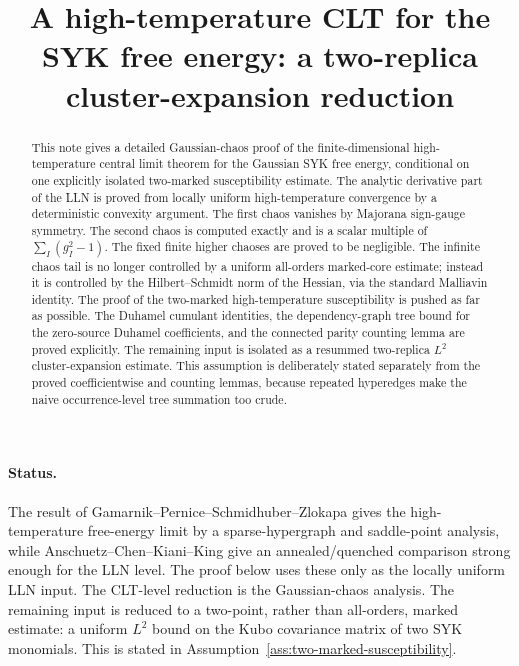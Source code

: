 \documentclass[11pt]{article}
\title{A high-temperature CLT for the SYK free energy: a two-replica cluster-expansion reduction}
\author{}
\date{}
\begin{document}
\maketitle

\begin{abstract}
  This note gives a detailed Gaussian-chaos proof of the finite-dimensional
  high-temperature central limit theorem for the Gaussian SYK free energy,
  conditional on one explicitly isolated two-marked susceptibility estimate.
  The analytic derivative part of the LLN is proved from locally uniform
  high-temperature convergence by a deterministic convexity argument.  The first
  chaos vanishes by Majorana sign-gauge symmetry.  The second chaos is computed
  exactly and is a scalar multiple of $\sum_I(g_I^2-1)$.  The fixed finite
  higher chaoses are proved to be negligible.  The infinite chaos tail is no
  longer controlled by a uniform all-orders marked-core estimate; instead it is
  controlled by the Hilbert--Schmidt norm of the Hessian, via the standard
  Malliavin identity.  The proof of the two-marked high-temperature susceptibility is pushed as far
  as possible.  The Duhamel cumulant identities, the dependency-graph
  tree bound for the zero-source Duhamel coefficients, and the connected
  parity counting lemma are proved explicitly.  The remaining input is isolated
  as a resummed two-replica $L^2$ cluster-expansion estimate.  This assumption
  is deliberately stated separately from the proved coefficientwise and
  counting lemmas, because repeated hyperedges make the naive occurrence-level
  tree summation too crude.
\end{abstract}

\paragraph{Status.}
The result of Gamarnik--Pernice--Schmidhuber--Zlokapa gives the high-temperature
free-energy limit by a sparse-hypergraph and saddle-point analysis, while
Anschuetz--Chen--Kiani--King give an annealed/quenched comparison strong enough
for the LLN level.  The proof below uses these only as the locally uniform LLN
input.  The CLT-level reduction is the Gaussian-chaos analysis.  The remaining
input is reduced to a two-point, rather than all-orders, marked estimate: a
uniform $L^2$ bound on the Kubo covariance matrix of two SYK monomials.  This is
stated in Assumption~\ref{ass:two-marked-susceptibility}.


\newpage
\tableofcontents
\newpage
\end{document}
